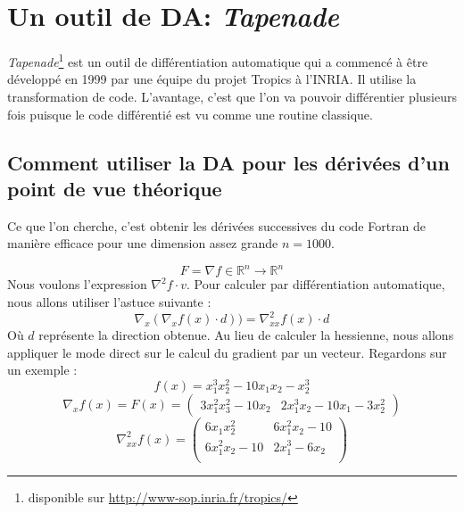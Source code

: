 


\section{Un outil de DA: {\it Tapenade}}
\label{sec:tapenade}


{\it Tapenade}\footnote{disponible sur \url{http://www-sop.inria.fr/tropics/}} est un outil de diff\'erentiation automatique qui a commenc\'e \`a être d\'evelopp\'e en 1999
par une \'equipe du projet Tropics \`a l'INRIA. 
 Il utilise la transformation de code. L'avantage, c'est que l'on va pouvoir diff\'erentier plusieurs fois
puisque le code diff\'erenti\'e est vu comme une routine classique.

    \subsection{Comment utiliser la DA pour les d\'eriv\'ees d'un point de vue th\'eorique}

Ce que l'on cherche, c'est obtenir les d\'eriv\'ees successives du code Fortran de mani\`ere efficace pour 
une dimension assez grande $n=1000$.

$$F=\nabla f \in \mathbb{R}^n \rightarrow \mathbb{R}^n$$
Nous voulons l'expression $\nabla^2 f\cdot v$. Pour calculer par diff\'erentiation automatique, nous allons utiliser l'astuce 
suivante :
$$\nabla_x(\nabla_x f(x) \cdot d)) = \nabla_{xx}^2f(x) \cdot d$$ O\`u $d$ repr\'esente la direction obtenue.
Au lieu de calculer la hessienne, nous allons appliquer le mode direct sur le calcul du gradient par un vecteur.
Regardons sur un exemple : 
$$f(x)=x_1^3x_2^2-10x_1x_2-x_2^3$$
$$\nabla_x f(x)=F(x)=\left( \begin{array}{cc}3x_1^2x_3^2-10x_2 & 2x_1^3x_2-10x_1-3x_2^2\end{array} \right)$$
$$\nabla_{xx}^2f(x)=\left( \begin{array}{cc}
6x_1x_2^2 & 6x_1^2x_2-10 \\
6x_1^2x_2-10 &  2x_1^3-6x_2 \\
\end{array} \right)$$


